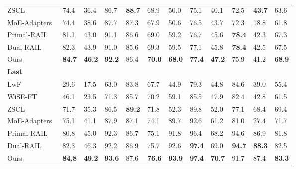 \documentclass{article}
\theoremstyle{plain}
\theoremstyle{definition}
\theoremstyle{remark}
\begin{document}
\begin{table}[tbhp]
\begin{tabular}{b{15em}b{1.6em}b{1.6em}b{1.6em}b{1.6em}b{1.6em}b{1.6em}b{1.6em}b{1.6em}b{1.6em}b{1.6em}>{\centering\arraybackslash}m{3em}}
          \quad ZSCL~\cite{zheng2023preventing} & 74.4 & 36.4 & 86.7 & \textbf{88.7} & 68.9 & 50.0 & 75.1 & 40.1 & 72.5 & \textbf{43.7} & {\cellcolor{lightgrey}}63.6\\
          \quad MoE-Adapters~\cite{yu2024boosting} & 74.4 & 38.6 & 87.7 & 87.3 & 67.9 & 50.6 & 76.5 & 43.7 & 72.3 & 18.8& {\cellcolor{lightgrey}}61.8\\
          \quad Primal-RAIL~\cite{xu2024advancing} & 81.1 & 43.0 & 91.1 & 86.6 & 69.0 & 59.2 & 76.7 & 45.6 & \textbf{78.4} & 42.3 & {\cellcolor{lightgrey}}67.3\\
          \quad Dual-RAIL~\cite{xu2024advancing} & 82.3 & 43.9 & 91.0 & 85.6 & 69.3 & 59.5 & 77.1 & 45.8 & \textbf{78.4} & 42.5 & {\cellcolor{lightgrey}}67.5\\
          \quad Ours & \textbf{84.7} & \textbf{46.2} & \textbf{92.2} & 86.4 & \textbf{70.0} & \textbf{68.0} & \textbf{77.4} & \textbf{47.2} & 75.9 & 41.2 & {\cellcolor{lightgrey}}\textbf{68.9}\\
    \midrule
        \multicolumn{11}{l}{\textbf{Last}}\\ 
          \quad LwF~\cite{li2017learning}& 29.6 & 17.5 & 63.0 & 83.8 & 67.7 & 44.9 & 79.3 & 44.8 & 84.6 & 39.0 & {\cellcolor{lightgrey}}55.4\\ 
          \quad WiSE-FT~\cite{wortsman2022robust} & 46.1 & 23.5 & 71.3 & 85.7 & 70.2 & 59.1 & 85.5 & 47.9 & 82.4 & 42.8 & {\cellcolor{lightgrey}}61.5\\ 
          \quad ZSCL~\cite{zheng2023preventing} & 71.7 & 35.3 & 86.5 & \textbf{89.2} & 71.8 & 52.3 & 89.8 & 52.0 & 77.1 & 68.4 & {\cellcolor{lightgrey}}69.4\\ 
          \quad MoE-Adapters~\cite{yu2024boosting} & 75.1 & 41.1 & 87.9 & 87.1 & 74.1 & 89.7 & 92.6 & 61.2 & 81.0 & 27.4& {\cellcolor{lightgrey}}71.7\\ 
          \quad Primal-RAIL~\cite{xu2024advancing} & 80.8 & 45.0 & 92.3 & 86.7 & 75.1 & 91.8 & 96.4 & 68.2 & 94.6 & 86.9 & {\cellcolor{lightgrey}}81.8\\ 
          \quad Dual-RAIL~\cite{xu2024advancing} & 82.3 & 46.3 & 92.2 & 86.9 & 75.7 & 92.6 & \textbf{97.4} & 69.0 & \textbf{94.7} & \textbf{88.3} & {\cellcolor{lightgrey}}82.5\\
          \quad Ours & \textbf{84.8} & \textbf{49.2} & \textbf{93.6} & 87.6 & \textbf{76.6} & \textbf{93.9} & \textbf{97.4} & \textbf{70.7} & 91.7 & 87.4 & {\cellcolor{lightgrey}}\textbf{83.3}\\
    \bottomrule
    \end{tabular}
\end{table}
\end{document}
